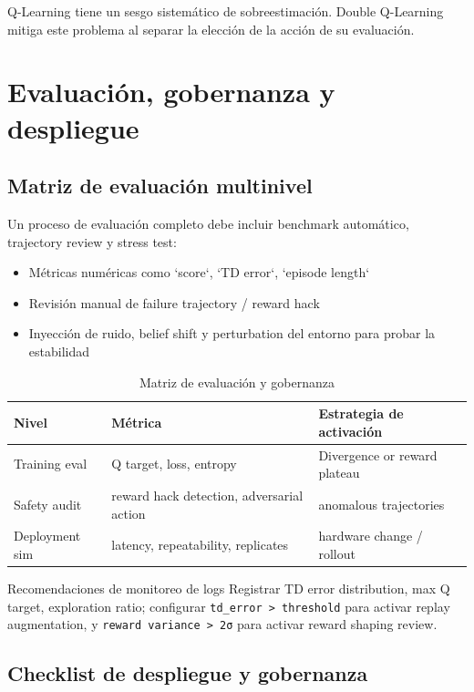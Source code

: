 \documentclass[a4paper]{article}
\begin{document}
Q-Learning tiene un sesgo sistemático de sobreestimación. Double Q-Learning mitiga este problema al separar la elección de la acción de su evaluación.

\section{Evaluación, gobernanza y despliegue}

\subsection{Matriz de evaluación multinivel}

Un proceso de evaluación completo debe incluir benchmark automático, trajectory review y stress test:

\begin{itemize}
    \item Métricas numéricas como `score`, `TD error`, `episode length`
    \item Revisión manual de failure trajectory / reward hack
    \item Inyección de ruido, belief shift y perturbation del entorno para probar la estabilidad
\end{itemize}

\begin{table}[H]
\centering
\begin{tabular}{p{} p{} p{}}
\toprule
Nivel & Métrica & Estrategia de activación \\
\midrule
Training eval & Q target, loss, entropy & Divergence or reward plateau \\
Safety audit & reward hack detection, adversarial action & anomalous trajectories \\
Deployment sim & latency, repeatability, replicates & hardware change / rollout \\
\bottomrule
\end{tabular}
\caption{Matriz de evaluación y gobernanza}
\end{table}

\begin{knowledgebox}{Recomendaciones de monitoreo de logs}
Registrar TD error distribution, max Q target, exploration ratio; configurar \texttt{td\_error > threshold} para activar replay augmentation, y \texttt{reward variance > 2σ} para activar reward shaping review.
\end{knowledgebox}

\subsection{Checklist de despliegue y gobernanza}
\end{document}

